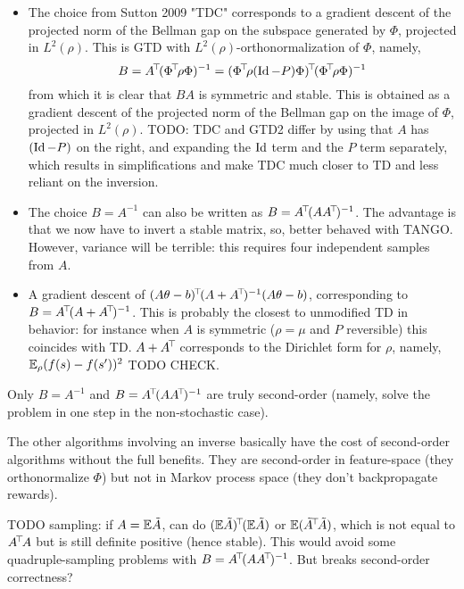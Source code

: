 \documentclass[11pt,a4paper]{article}
\begin{document}
\begin{itemize}
\item The choice from Sutton 2009 "TDC" corresponds to a gradient descent
of the projected norm of the Bellman gap on the subspace generated by
$\Phi$, projected in $L^2(\rho)$. This is GTD with $L^2(\rho)$-orthonormalization of
$\Phi$, namely,
\begin{equation}
B=\transp{A} (\transp{\Phi}\rho\Phi)^{-1}=\transp{(\transp{\Phi}\rho(\Id-P)\Phi)}(\transp{\Phi}\rho\Phi)^{-1}
\end{equation}
from which it is clear that $BA$ is symmetric and stable. This is obtained as a
gradient descent of the projected norm of the Bellman gap on the image of
$\Phi$, projected in $L^2(\rho)$. TODO: TDC and GTD2 differ by using that
$A$ has $(\operatorname{Id}-P)$ on  the right, and expanding the $\operatorname{Id}$ term and the $P$
term separately, which results in simplifications and make TDC much
closer to TD and less reliant on the inversion.

\item The choice $B=A^{-1}$ can also be written as
$B=A^{\!\top}\!(AA^{\!\top}\!)^{-1}$. The advantage is that we now have to
invert a stable matrix, so, better behaved with TANGO. However, variance
will be terrible: this requires four independent samples from $A$.

\item A gradient descent of
$(A\theta-b)^{\!\top}\!(A+A^{\!\top}\!)^{-1}(A\theta-b)$, corresponding to
$B=A^{\!\top}\!(A+A^{\!\top}\!)^{-1}$. This is probably the closest to
unmodified TD in behavior: for instance when $A$ is symmetric ($\rho=\mu$
and $P$ reversible) this coincides with TD. $A+A^{\!\top}\!$ corresponds to
the Dirichlet form for $\rho$, namely, $\mathbb{E}_{\rho} (f(s)-f(s'))^2$ TODO
CHECK.

\end{itemize}

Only $B=A^{-1}$ and $B=A^{\!\top}\!(AA^{\!\top}\!)^{-1}$ are truly
second-order (namely, solve the problem in one step in the non-stochastic
case).

The other algorithms involving an inverse basically have the cost of
second-order algorithms without the full benefits.  They are second-order
in feature-space (they orthonormalize $\Phi$) but not in Markov process
space (they don't backpropagate rewards).

TODO sampling: if $A=\mathbb{E} \tilde A$, can do $(\mathbb{E} \tilde A)^{\!\top}\!(\mathbb{E}
\tilde A)$ or
$\mathbb{E}(\tilde A^{\!\top}\!\tilde A)$, which is not equal to $A^{\!\top}\!A$ but
is still definite positive (hence stable). This would avoid some
quadruple-sampling problems with $B=A^{\!\top}\!(AA^{\!\top}\!)^{-1}$. But
breaks second-order correctness?
\end{document}
